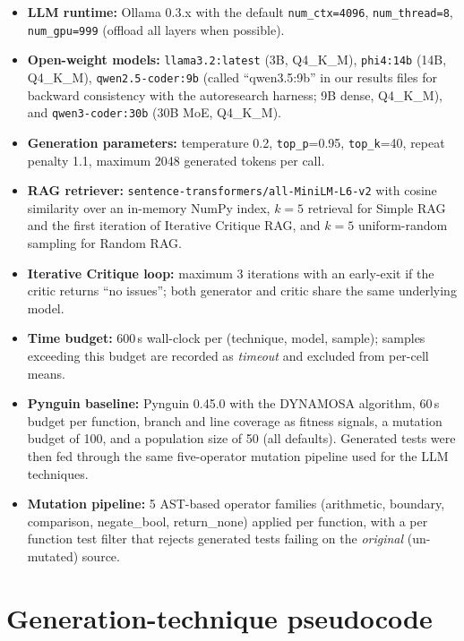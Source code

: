 \documentclass[smallextended]{svjour3}
\begin{document}
\begin{itemize}
\item \textbf{LLM runtime:} Ollama 0.3.x with the default
  \texttt{num\_ctx=4096}, \texttt{num\_thread=8},
  \texttt{num\_gpu=999} (offload all layers when possible).
\item \textbf{Open-weight models:} \texttt{llama3.2:latest} (3B,
  Q4\_K\_M), \texttt{phi4:14b} (14B, Q4\_K\_M),
  \texttt{qwen2.5-coder:9b} (called ``qwen3.5:9b'' in our
  results files for backward consistency with the autoresearch
  harness; 9B dense, Q4\_K\_M), and \texttt{qwen3-coder:30b}
  (30B MoE, Q4\_K\_M).
\item \textbf{Generation parameters:} temperature 0.2,
  \texttt{top\_p}=0.95, \texttt{top\_k}=40, repeat penalty 1.1,
  maximum 2048 generated tokens per call.
\item \textbf{RAG retriever:}
  \texttt{sentence-transformers/all-MiniLM-L6-v2} with cosine
  similarity over an in-memory NumPy index, $k = 5$ retrieval
  for Simple RAG and the first iteration of Iterative Critique
  RAG, and $k = 5$ uniform-random sampling for Random RAG.
\item \textbf{Iterative Critique loop:} maximum 3 iterations
  with an early-exit if the critic returns ``no issues''; both
  generator and critic share the same underlying model.
\item \textbf{Time budget:} 600\,s wall-clock per
  (technique, model, sample); samples exceeding this budget are
  recorded as \emph{timeout} and excluded from per-cell means.
\item \textbf{Pynguin baseline:} Pynguin 0.45.0 with the
  DYNAMOSA algorithm, 60\,s budget per function, branch and
  line coverage as fitness signals, a mutation budget of 100,
  and a population size of 50 (all defaults). Generated tests
  were then fed through the same five-operator mutation pipeline
  used for the LLM techniques.
\item \textbf{Mutation pipeline:} 5 AST-based operator families
  (arithmetic, boundary, comparison, negate\_bool,
  return\_none) applied per function, with a per function test
 filter that rejects generated tests failing on the
  \emph{original} (un-mutated) source.
\end{itemize}

\section{Generation-technique pseudocode}\label{app:pseudocode}
\end{document}
